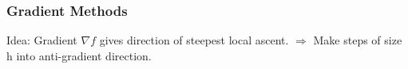 \documentclass[8pt,a4paper]{scrartcl}
\begin{document}
\begin{multicols*}{3}
\begin{multicols*}{4}
\subsubsection{Gradient Methods}

Idea: Gradient $\nabla f$ gives direction of steepest local ascent. $\Rightarrow$ Make steps of size h into anti-gradient direction.


%
%
%
%
%
%
%
%
%
%
%
%
%
%
%
%
%
%
%
%
%
%
%
%
%

\end{multicols*}
\end{multicols*}
\end{document}
